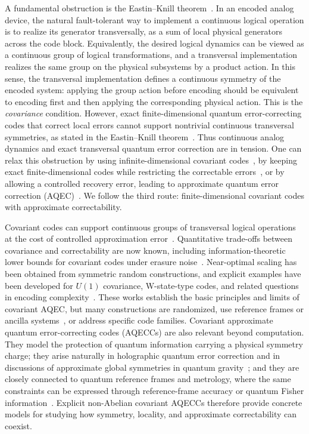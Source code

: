 \documentclass[10pt,twocolumn,superscriptaddress,aps,amsmath,amssymb,citeautoscript,floatfix,prx]{revtex4-2}
\theoremstyle{plain}
\theoremstyle{plain}
\theoremstyle{plain}
\theoremstyle{plain}
\theoremstyle{plain}
\theoremstyle{plain}
\theoremstyle{plain}
\theoremstyle{definition}
\theoremstyle{plain}
\begin{document}
A fundamental obstruction is the Eastin--Knill theorem~\cite{Eastin2009}. In an encoded analog device, the natural fault-tolerant way to implement a continuous logical operation is to realize its generator transversally, 
as a sum of local physical generators across the code block. 
Equivalently, the desired logical dynamics can be viewed as a continuous group of logical transformations, and a transversal implementation realizes the same group on the physical subsystems by a product action. 
In this sense, the transversal implementation defines a continuous symmetry of the encoded system: applying the group action before encoding should be equivalent to encoding 
first and then applying the corresponding physical action. This is the \textit{covariance} condition. 
However, exact finite-dimensional quantum error-correcting codes that correct local errors cannot support nontrivial continuous transversal symmetries, 
as stated in the Eastin--Knill theorem~\cite{Eastin2009}. Thus continuous analog dynamics and exact transversal quantum error correction are in tension. 
One can relax this obstruction by using infinite-dimensional covariant codes~\cite{Hayden2021}, by keeping exact finite-dimensional codes while restricting the correctable 
errors~\cite{Gupta2024}, or by allowing a controlled recovery error, leading to approximate quantum error correction (AQEC)~\cite{schumacher2002approximate, Beny2010}. 
We follow the third route: finite-dimensional covariant codes with approximate correctability.

Covariant codes can support continuous groups of transversal logical operations at the cost of controlled approximation error~\cite{Faist2020}. 
Quantitative trade-offs between covariance and correctability are now known, including information-theoretic lower bounds for covariant codes under erasure noise~\cite{Faist2020,Zhou2021,Faist2023,Kong2022,Yang2022}. 
Near-optimal scaling has been obtained from symmetric random constructions, and explicit examples have been developed for $U(1)$ covariance, W-state-type codes, and related questions in encoding complexity~\cite{Lin2025,Faist2020,Alexander2025,Yi2024}. 
These works establish the basic principles and limits of covariant AQEC, but many constructions are randomized, use reference frames or ancilla systems~\cite{Kong2022,Yang2022}, or address specific code families. 
Covariant approximate quantum error-correcting codes (AQECCs) are also relevant beyond computation. They model the protection of quantum information carrying a physical symmetry charge; 
they arise naturally in holographic quantum error correction and in discussions of approximate global symmetries in quantum gravity~\cite{Almheiri2015,Pastawski2015,HarlowOoguri2019}; 
and they are closely connected to quantum reference frames and metrology, where the same constraints can be expressed through reference-frame accuracy or quantum Fisher information~\cite{Hayden2021,Woods2020,Kubica2021}. 
Explicit non-Abelian covariant AQECCs therefore provide concrete models for studying how symmetry, locality, and approximate correctability can coexist.
\end{document}
